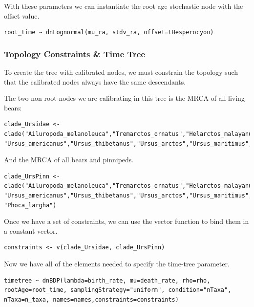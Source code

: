 With these parameters we can instantiate the root age stochastic node with the offset value.
{\tt \begin{snugshade*}
\begin{lstlisting}
root_time ~ dnLognormal(mu_ra, stdv_ra, offset=tHesperocyon)
\end{lstlisting}
\end{snugshade*}}


\subsubsection{Topology Constraints \& Time Tree}

To create the tree with calibrated nodes, we must constrain the topology such that the calibrated nodes always have the same descendants.

The two non-root nodes we are calibrating in this tree is the MRCA of all living bears:
{\tt \begin{snugshade*}
\begin{lstlisting}
clade_Ursidae <- clade("Ailuropoda_melanoleuca","Tremarctos_ornatus","Helarctos_malayanus", "Ursus_americanus","Ursus_thibetanus","Ursus_arctos","Ursus_maritimus","Melursus_ursinus")
\end{lstlisting}
\end{snugshade*}}

And the MRCA of all bears and pinnipeds. 
{\tt \begin{snugshade*}
\begin{lstlisting}
clade_UrsPinn <- clade("Ailuropoda_melanoleuca","Tremarctos_ornatus","Helarctos_malayanus", "Ursus_americanus","Ursus_thibetanus","Ursus_arctos","Ursus_maritimus","Melursus_ursinus", "Phoca_largha")
\end{lstlisting}
\end{snugshade*}}

Once we have a set of constraints, we can use the vector function  to bind them in a constant vector.
{\tt \begin{snugshade*}
\begin{lstlisting}
constraints <- v(clade_Ursidae, clade_UrsPinn)
\end{lstlisting}
\end{snugshade*}}

Now we have all of the elements needed to specify the time-tree parameter.
{\tt \begin{snugshade*}
\begin{lstlisting}
timetree ~ dnBDP(lambda=birth_rate, mu=death_rate, rho=rho, rootAge=root_time, samplingStrategy="uniform", condition="nTaxa", nTaxa=n_taxa, names=names,constraints=constraints)
\end{lstlisting}
\end{snugshade*}}


